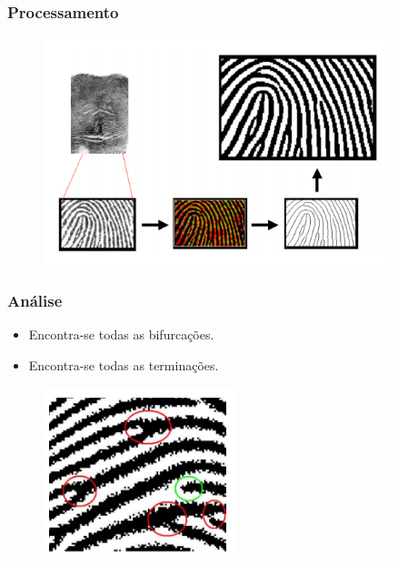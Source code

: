 \documentclass{beamer}
\begin{document}

\begin{frame}
\frametitle{Processamento}

	\begin{figure}[!h]
		\begin{center}
			\includegraphics[width=0.9\textwidth]{Figures/process}
		\end{center}
		
	\end{figure}
	
\end{frame}


\begin{frame}
\frametitle{Análise}
		
		\begin{itemize}
			\item Encontra-se todas as bifurcações.
			\item Encontra-se todas as terminações.
		\end{itemize}

	\begin{figure}[!h]
		\begin{center}
			\includegraphics[width=0.5\textwidth]{Figures/features}
		\end{center}
		
	\end{figure}
	
\end{frame}
\end{document}
